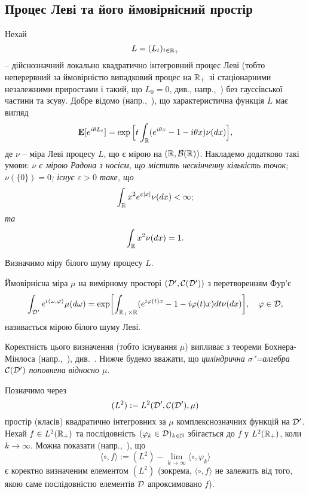 \subsection{Процес Леві та його ймовірнісний простір}
Нехай
\[
    L=(L_t)_{t\in\mathbb{R}_+}
\]
-- дійснозначний локально квадратично інтегровний процес Леві (тобто неперервний за ймовірністю випадковий процес на $\mathbb{R}_+$ зі стаціонарними незалежними приростами і такий, що $L_0=0$, див., напр.,~\cite{B96}) без гауссівської частини та зсуву.
Добре відомо (напр.,~\cite{NOP04}), що характеристична функція $L$ має вигляд
\begin{equation}\label{e1_1}
    \mathbf{E}[e^{i\theta L_t}] =\exp\Big[t\int_{\mathbb{R}}(e^{i\theta x}-1-i\theta x)\nu(dx)\Big],
\end{equation}
де $\nu$ -- міра Леві процесу $L$, що є мірою на $(\mathbb{R},\mathcal B(\mathbb{R}))$.
Накладемо додатково такі умови:
{\it $\nu$ є мірою Радона з носієм, що містить нескінченну кількість точок;
$\nu(\{0\})=0$; існує $\varepsilon>0$ таке, що
\[ \int_{\mathbb{R}}x^2e^{\varepsilon |x|}\nu(dx)<\infty;\]
та
\begin{equation}\label{e1_26}
\int_{\mathbb{R}}x^2\nu(dx)=1.
\end{equation}
}

Визначимо міру білого шуму процесу $L$.
\begin{subdefinition}
Ймовірнісна міра $\mu$ на вимірному просторі $(\mathcal{D}',\mathcal{C}(\mathcal{D}'))$ з перетворенням Фур'є
\begin{equation}\label{e1_2}
    \int_{\mathcal{D}'}e^{i\langle\omega,\varphi\rangle}\mu(d\omega)
        =\exp\biggl[\int_{\mathbb{R}_+\times\mathbb{R}}(e^{i\varphi(t)x}-1-i\varphi(t)x)dt\nu(dx)\biggr],
    \quad
    \varphi\in\mathcal{D},
\end{equation}
називається мірою білого шуму Леві.
\end{subdefinition}
Коректність цього визначення (тобто існування $\mu$) випливає з теореми Бохнера-Мінлоса (напр.,~\cite{HOUZ96}), див.~\cite{L03}.
Нижче будемо вважати, що {\it циліндрична $\sigma$"=алгебра $\mathcal{C}(\mathcal{D}')$ поповнена відносно $\mu$}.

Позначимо через
\[
    (L^2):=L^2(\mathcal{D}',\mathcal{C}(\mathcal{D}'),\mu)
\]
простір (класів) квадратично інтегровних за $\mu$ комплекснозначних функцій на $\mathcal{D}'$.
Нехай $f\in L^2(\mathbb{R}_+)$ та послідовність $(\varphi_k\in\mathcal{D})_{k\in\mathbb{N}}$ збігається до $f$ у $L^2(\mathbb{R}_+)$, коли $k\to\infty$.
Можна показати (напр.,~\cite{L03,K13}), що
\[
    \langle\circ,f\rangle :=(L^2) - \lim\limits_{k\to\infty}\langle\circ,\varphi_k\rangle
\]
є коректно визначеним елементом $(L^2)$ (зокрема, $\langle\circ,f\rangle$ не залежить від того, якою саме послідовністю елементів $\mathcal{D}$ апроксимовано $f$).

